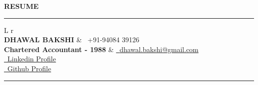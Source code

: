 \documentclass[a4paper,11pt]{article}
\makeatletter
\newcommand{\name}{\MakeUppercase{Dhawal Bakshi}} %
\newcommand{\Qualification}{Chartered Accountant - 1988} %
\newcommand{\phone}{94084 39126} %
\newcommand{\emaila}{dhawal.bakshi@gmail.com} %
\makeatother
\begin{document}
\selectfont

{
\begin{center}
\textbf{\Huge RESUME}
\end{center}
\vspace{2mm}
\hrule\vspace{-2mm}
\begin{tabularx}{\linewidth}{L r} \\
  \textbf{\Large \name} & {\raisebox{0.0\height}{\footnotesize \faPhone}\ +91-\phone}\\
  \textbf{\Large \Qualification} & \href{mailto:\emaila}{\raisebox{0.0\height}{\footnotesize \faEnvelope}\ {\emaila}} \\ 
  \href{https://www.linkedin.com/in/dhawal-bakshi-2370b321}{\raisebox{0.0\height}
  {\footnotesize \faLinkedin}\ {Linkedin Profile}} \\
  \href{https://github.com/jdb130496}{\raisebox{0.0\height}
  {\footnotesize \faGithub}\ {Github Profile}} \\
\end{tabularx}
}
\vspace{1mm}

\hrule\vspace{-2mm}
\end{document}
